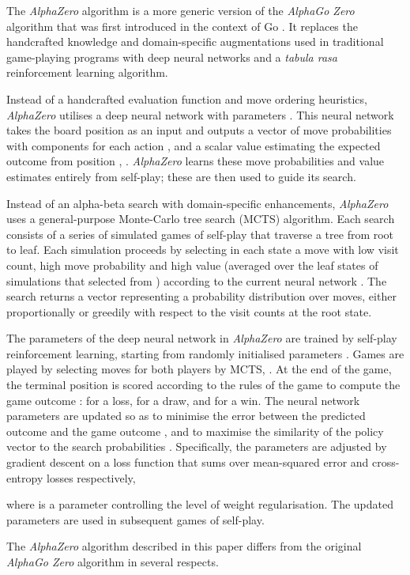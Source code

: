 \documentclass[12pt]{article}
\begin{document}
The \emph{AlphaZero} algorithm is a more generic version of the \emph{AlphaGo Zero} algorithm that was first introduced in the context of Go \cite{Silver17AG0}. It replaces the handcrafted knowledge and domain-specific augmentations used in traditional game-playing programs with deep neural networks and a \emph{tabula rasa} reinforcement learning algorithm. 

Instead of a handcrafted evaluation function and move ordering heuristics, \emph{AlphaZero} utilises a deep neural network  with parameters . This neural network takes the board position  as an input and outputs a vector of move probabilities  with components  for each action , and a scalar value  estimating the expected outcome  from position , . \emph{AlphaZero} learns these move probabilities and value estimates entirely from self-play; these are then used to guide its search. 

Instead of an alpha-beta search with domain-specific enhancements, \emph{AlphaZero} uses a general-purpose Monte-Carlo tree search (MCTS) algorithm. 
Each search consists of a series of simulated games of self-play that traverse a tree from root  to leaf. Each simulation proceeds by selecting in each state  a move  with low visit count, high move probability and high value (averaged over the leaf states of simulations that selected  from ) according to the current neural network . The search returns a vector  representing a probability distribution over moves, either proportionally or greedily with respect to the visit counts at the root state. 

The parameters  of the deep neural network in \emph{AlphaZero} are trained by self-play reinforcement learning, starting from randomly initialised parameters . Games are played by selecting moves for both players by MCTS, . At the end of the game, the terminal position  is scored according to the rules of the game to compute the game outcome :  for a loss,  for a draw, and  for a win. The neural network parameters  are updated so as to minimise the error between the predicted outcome  and the game outcome , and to maximise the similarity of the policy vector  to the search probabilities .  Specifically, the parameters  are adjusted by gradient descent on a loss function  that sums over mean-squared error and cross-entropy losses respectively, 

where  is a parameter controlling the level of  weight regularisation.
The updated parameters are used in subsequent games of self-play.

The \emph{AlphaZero} algorithm described in this paper differs from the original \emph{AlphaGo Zero} algorithm in several respects. 
\end{document}
